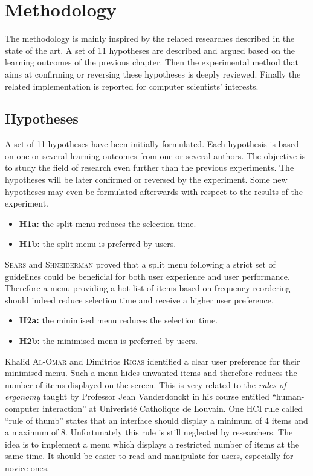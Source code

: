 \chapter{Methodology}

The methodology is mainly inspired by the related researches described in the 
state of the art. A set of 11 hypotheses are described and argued based on the 
learning outcomes of the previous chapter. Then the experimental method that 
aims at confirming or reversing these hypotheses is deeply reviewed. Finally 
the related implementation is reported for computer scientists’ interests.

\section{Hypotheses} \label{hypotheses}

A set of 11 hypotheses have been initially formulated. Each hypothesis is based 
on one or 
several learning outcomes from one or several authors. The objective is to 
study the field of research even further than the previous experiments. The 
hypotheses will be later confirmed or reversed by the experiment. Some new 
hypotheses may even be formulated afterwards with respect to the results of the 
experiment.

\begin{itemize}
 \item \textbf{H1a:} the split menu reduces the selection time.
 \item \textbf{H1b:} the split menu is preferred 
by users.
\end{itemize}

\textsc{Sears} and \textsc{Shneiderman} proved that a split menu following a 
strict set of 
guidelines could be beneficial for both user experience and user performance. 
Therefore a menu providing a hot list of items based on frequency reordering 
should indeed reduce selection time and receive a higher user 
preference.

\begin{itemize}
  \item \textbf{H2a:} the minimised menu reduces the selection time.
  \item \textbf{H2b:} the minimised menu is preferred by users.
\end{itemize}

Khalid \textsc{Al-Omar} and Dimitrios \textsc{Rigas} identified a clear user 
preference for their 
minimised menu. Such a menu hides unwanted items and therefore reduces the 
number of items displayed on the screen. This is very related to the 
\textit{rules of ergonomy} taught by Professor Jean Vanderdonckt in his course 
entitled \enquote{human-computer interaction} at Univeristé Catholique de 
Louvain. One HCI rule called \enquote{rule of thumb} states that an 
interface should display a minimum of 4 items and a maximum of 8. Unfortunately 
this rule is still neglected by researchers. The idea is to implement a menu 
which displays a restricted number of items at the same time. It should be 
easier to read and manipulate for users, especially for novice ones.

